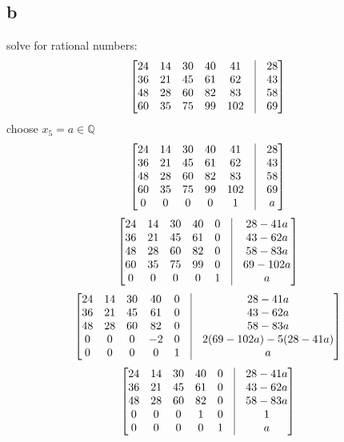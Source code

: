 \documentclass[a4paper,10pt]{article}
\begin{document}
\subsection*{b}
solve for rational numbers:
\[
\begin{bmatrix}
 24 & 14 & 30 & 40 & 41 & \vline & 28\\
 36 & 21 & 45 & 61 & 62 & \vline & 43\\
 48 & 28 & 60 & 82 & 83 & \vline & 58\\
 60 & 35 & 75 & 99 & 102 &\vline & 69\\
\end{bmatrix}
\]
choose $x_5=a \in \mathbb{Q}$
\[
\begin{bmatrix}
 24 & 14 & 30 & 40 & 41 & \vline & 28\\
 36 & 21 & 45 & 61 & 62 & \vline & 43\\
 48 & 28 & 60 & 82 & 83 & \vline & 58\\
 60 & 35 & 75 & 99 & 102 &\vline & 69\\
 0 &  0  & 0  & 0  &   1 & \vline & a\\
\end{bmatrix}
\]
\[
\begin{bmatrix}
 24 & 14 & 30 & 40 & 0 & \vline & 28-41a\\
 36 & 21 & 45 & 61 & 0 & \vline & 43-62a\\
 48 & 28 & 60 & 82 & 0 & \vline & 58-83a\\
 60 & 35 & 75 & 99 & 0 &\vline & 69-102a\\
 0 &  0  & 0  & 0  &   1 & \vline & a\\
\end{bmatrix}
\]
\[
\begin{bmatrix}
 24 & 14 & 30 & 40 & 0 & \vline & 28-41a\\
 36 & 21 & 45 & 61 & 0 & \vline & 43-62a\\
 48 & 28 & 60 & 82 & 0 & \vline & 58-83a\\
 0 & 0 & 0 & -2 & 0 &\vline & 2(69-102a)-5(28-41a)\\
 0 &  0  & 0  & 0  &   1 & \vline & a\\
\end{bmatrix}
\]
\[
\begin{bmatrix}
 24 & 14 & 30 & 40 & 0 & \vline & 28-41a\\
 36 & 21 & 45 & 61 & 0 & \vline & 43-62a\\
 48 & 28 & 60 & 82 & 0 & \vline & 58-83a\\
 0 & 0   & 0  & 1  & 0 & \vline & 1\\
 0 &  0  & 0  & 0  & 1 & \vline & a\\
\end{bmatrix}
\]
\end{document}
